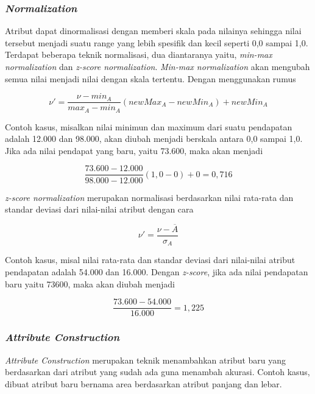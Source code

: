 \subsubsection{\textsl{Normalization}}
Atribut dapat dinormalisasi dengan memberi skala pada nilainya sehingga nilai tersebut menjadi suatu range yang lebih spesifik dan kecil seperti 0,0 sampai 1,0.
Terdapat beberapa teknik normalisasi, dua diantaranya yaitu, \textsl{min-max normalization} dan \textsl{z-score normalization}. \textsl{Min-max normalization} akan mengubah semua nilai menjadi nilai dengan skala tertentu. Dengan menggunakan rumus 

\begin{displaymath}
	\nu' = \frac{\nu-min_{A}}{max_{A}-min_{A}}(newMax_{A}-newMin_{A})+newMin_{A}	
\end{displaymath}

Contoh kasus, misalkan nilai minimun dan maximum dari suatu pendapatan adalah 12.000 dan 98.000, akan diubah menjadi berskala antara 0,0 sampai 1,0. Jika ada nilai pendapat yang baru, yaitu 73.600, maka akan menjadi

\begin{displaymath}
\frac{73.600-12.000}{98.000-12.000} (1,0-0)+0 = 0,716
\end{displaymath}

\textsl{z-score normalization} merupakan normalisasi berdasarkan nilai rata-rata dan standar deviasi dari nilai-nilai atribut dengan cara

\begin{displaymath}
\nu' = \frac{\nu-\overline{A}}{\sigma_{A}}
\end{displaymath}

Contoh kasus, misal nilai rata-rata dan standar deviasi dari nilai-nilai atribut pendapatan adalah 54.000 dan 16.000. Dengan \textsl{z-score}, jika ada nilai pendapatan baru yaitu 73600, maka akan diubah menjadi

\begin{displaymath}
\frac{73.600-54.000}{16.000} = 1,225 
\end{displaymath}

\subsubsection{\textsl{Attribute Construction}}
\textsl{Attribute Construction} merupakan teknik menambahkan atribut baru yang berdasarkan dari atribut yang sudah ada guna menambah akurasi. Contoh kasus, dibuat atribut baru bernama area berdasarkan atribut panjang dan lebar. 

